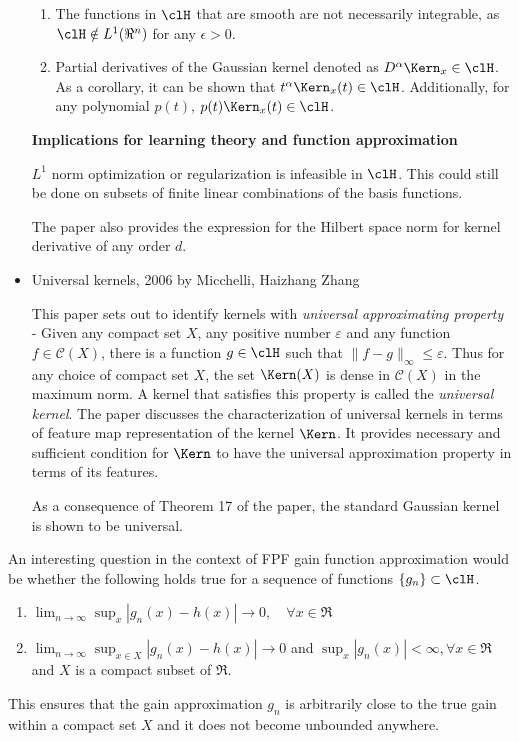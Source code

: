 \begin{itemize}
\begin{enumerate}
	\item The functions in $\clH$ that are smooth are not necessarily integrable, as $\clH \notin L^1(\Re^n)$ for any $\epsilon >0$. 
	

\item Partial derivatives of the Gaussian kernel denoted as $D^\alpha \Kern_x \in \clH$. As a corollary, it can be shown that $t^\alpha \Kern_x(t)\in\clH$. Additionally, for any polynomial $p(t)$, $p(t) \Kern_x(t) \in \clH$. 

\end{enumerate}

\textbf{Implications for learning theory and function approximation}

$L^1$ norm optimization or regularization is infeasible in $\clH$. This could still be done on subsets of finite linear combinations of the basis functions.

The paper also provides the expression for the Hilbert space norm for kernel derivative of any order $d$. 


\item Universal kernels, 2006 by Micchelli, Haizhang Zhang

This paper sets out to identify kernels with \textit{universal approximating property} - Given any compact set $X$,  any positive number $\varepsilon$ and any function $f \in \mathcal{C}(X)$, there is a function $g \in \clH$ such that $\| f - g\|_{\infty} \leq \varepsilon$. Thus for any choice of compact set $X$, the set $\Kern(X)$ is dense in $\mathcal{C}(X)$ in the maximum norm. A kernel that satisfies this property is called the \textit{universal kernel}. The paper discusses the characterization of universal kernels in terms of feature map representation of the kernel $\Kern$. It provides necessary and sufficient condition for $\Kern$ to have the universal approximation property in terms of its features. 

As a consequence of Theorem 17 of the paper, the standard Gaussian kernel is shown to be universal. 
\end{itemize}

An interesting question in the context of FPF gain function approximation would be whether the following holds true for a sequence of functions $\{g_n\} \subset \clH$.
\begin{enumerate}
\item $\lim_{n \to \infty} \sup_x |g_n(x) -h(x) | \to 0,\quad \forall x \in \Re$
\item $ \lim_{n \to \infty}\sup_{x \in X} |g_n(x) - h(x) | \to 0$ and $\sup_x |g_n(x)| < \infty,  \forall x \in \Re$ and $X$ is a compact subset of $\Re$. 
\end{enumerate}
This ensures that the gain approximation $g_n$ is arbitrarily close to the true gain within a compact set $X$ and it does not become unbounded anywhere. 


